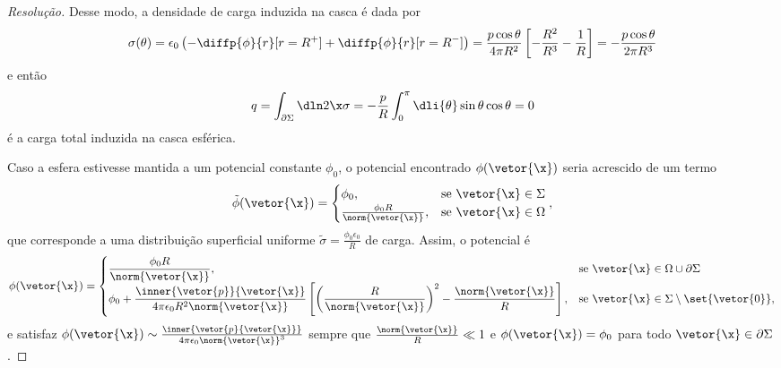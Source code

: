 \begin{proof}[Resolução]
    Desse modo, a densidade de carga induzida na casca é dada por
    \begin{equation*}
        \sigma(\theta) = \epsilon_0\left(-\diffp{\phi}{r}[r = R^+] + \diffp{\phi}{r}[r = R^-]\right) = \frac{p\cos\theta}{4\pi R^2} \left[-\frac{R^2}{R^3} - \frac{1}{R}\right] = -\frac{p \cos\theta}{2\pi R^3}
    \end{equation*}
    e então
    \begin{equation*}
        q = \int_{\partial \Sigma} \dln2{\x} \sigma = -\frac{p}{R}\int_0^\pi \dli{\theta} \sin\theta \cos\theta = 0
    \end{equation*}
    é a carga total induzida na casca esférica.

    Caso a esfera estivesse mantida a um potencial constante \(\phi_0\), o potencial encontrado \(\phi(\vetor{\x})\) seria acrescido de um termo
    \begin{equation*}
        \tilde{\phi}(\vetor{\x}) = \begin{cases}
            \phi_0, &\text{se }\vetor{\x} \in \Sigma\\
            \frac{\phi_0 R}{\norm{\vetor{\x}}}, &\text{se }\vetor{\x} \in \Omega
        \end{cases},
    \end{equation*}
    que corresponde a uma distribuição superficial uniforme \(\tilde{\sigma} = \frac{\phi_0 \epsilon_0}{R}\) de carga. Assim, o potencial é
    \begin{equation*}
        \phi(\vetor{\x}) = \begin{cases}
            \displaystyle \frac{\phi_0 R}{\norm{\vetor{\x}}},&\text{se } \vetor{\x} \in \Omega \cup \partial \Sigma\\
            \displaystyle \phi_0 + \frac{\inner{\vetor{p}}{\vetor{\x}}}{4\pi \epsilon_0 R^2 \norm{\vetor{\x}}}\left[\left(\frac{R}{\norm{\vetor{\x}}}\right)^2 - \frac{\norm{\vetor{\x}}}{R}\right],&\text{se }\vetor{\x} \in \Sigma \setminus\set{\vetor{0}},
        \end{cases}
    \end{equation*}
    e satisfaz \(\phi(\vetor{\x}) \sim \frac{\inner{\vetor{p}{\vetor{\x}}}}{4\pi \epsilon_0 \norm{\vetor{\x}}^3}\) sempre que \(\frac{\norm{\vetor{\x}}}{R} \ll 1\) e \(\phi(\vetor{\x}) = \phi_0\) para todo \(\vetor{\x} \in \partial \Sigma\).
\end{proof}
